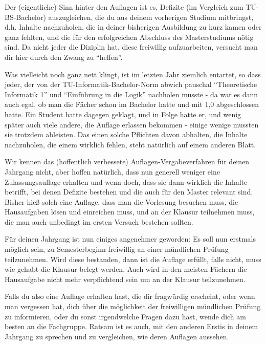 \begin{multicols}{2}
Der (eigentliche) Sinn hinter den Auflagen ist es, Defizite (im Vergleich zum TU-BS-Bachelor) auszugleichen, die du aus deinem vorherigen Studium mitbringst, d.h. Inhalte nachzuholen, die in deiner bisherigen Ausbildung zu kurz kamen oder ganz fehlten, und die für den erfolgreichen Abschluss des Masterstudiums nötig sind. Da nicht jeder die Diziplin hat, diese freiwillig aufzuarbeiten, versucht man dir hier durch den Zwang zu "`helfen"'.

Was vielleicht noch ganz nett klingt, ist im letzten Jahr ziemlich entartet, so dass jeder, der von der TU-Informatik-Bachelor-Norm abwich pauschal "`Theoretische Informatik 1"' und "`Einführung in die Logik"' nachholen musste - da war es dann auch egal, ob man die Fächer schon im Bachelor hatte und mit 1,0 abgeschlossen hatte. Ein Student hatte dagegen geklagt, und in Folge hatte er, und wenig später auch viele andere, die Auflage erlassen bekommen - einige wenige mussten sie trotzdem ableisten. Das einen solche Pflichten davon abhalten, die Inhalte nachzuholen, die einem wirklich fehlen, steht natürlich auf einem anderen Blatt.

Wir kennen das (hoffentlich verbessete) Auflagen-Vergabeverfahren für deinen Jahrgang nicht, aber hoffen natürlich, dass nun generell weniger eine Zulassungsauflage erhalten und wenn doch, dass sie dann wirklich die Inhalte betrifft, bei denen Defizite bestehen und die auch für den Master relevant sind. Bisher hieß solch eine Auflage, dass man die Vorlesung besuchen muss, die Hausaufgaben lösen und einreichen muss, und an der Klausur teilnehmen muss, die man auch unbedingt im ersten Versuch bestehen sollten. 

Für deinen Jahrgang ist nun einiges angenehmer geworden: Es soll nun erstmals möglich sein, zu Semesterbeginn freiwillig an einer mündlichen Prüfung teilzunehmen. Wird diese bestanden, dann ist die Auflage erfüllt, falls nicht, muss wie gehabt die Klausur belegt werden. Auch wird in den meisten Fächern die Hausaufgabe nicht mehr verpflichtend sein um an der Klausur teilzunehmen.

Falls du also eine Auflage erhalten hast, die dir fragwürdig erscheint, oder wenn man vergessen hat, dich über die möglichkeit der freiwilligen mündlichen Prüfung zu informieren, oder du sonst irgendwelche Fragen dazu hast, wende dich am besten an die Fachgruppe. Ratsam ist es auch, mit den anderen Erstis in deinem Jahrgang zu sprechen und zu vergleichen, wie deren Auflagen aussehen.


\end{multicols}
